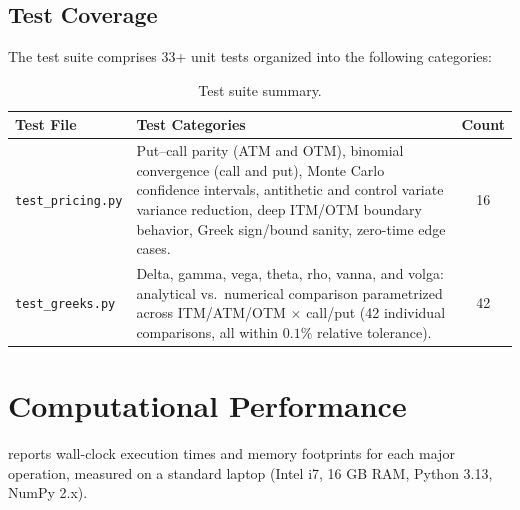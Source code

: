 \documentclass[11pt,a4paper]{article}
\begin{document}
\begin{appendices}
\subsection{Test Coverage}

The test suite comprises 33+ unit tests organized into the following categories:

\begin{table}[H]
    \centering
    \caption{Test suite summary.}
    \label{tab:tests}
    \begin{tabularx}{\textwidth}{lXc}
        \toprule
        \textbf{Test File} & \textbf{Test Categories} & \textbf{Count} \\
        \midrule
        \texttt{test\_pricing.py} & Put--call parity (ATM and OTM), binomial convergence (call and put), Monte Carlo confidence intervals, antithetic and control variate variance reduction, deep ITM/OTM boundary behavior, Greek sign/bound sanity, zero-time edge cases. & 16 \\
        \texttt{test\_greeks.py} & Delta, gamma, vega, theta, rho, vanna, and volga: analytical vs.\ numerical comparison parametrized across ITM/ATM/OTM $\times$ call/put (42 individual comparisons, all within $0.1\%$ relative tolerance). & 42 \\
        \bottomrule
    \end{tabularx}
\end{table}



\section{Computational Performance}\label{app:performance}

 reports wall-clock execution times and memory footprints for each major operation, measured on a standard laptop (Intel i7, 16 GB RAM, Python 3.13, NumPy 2.x).


\end{appendices}
\end{document}
